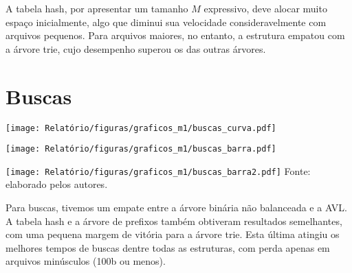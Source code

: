 A tabela hash, por apresentar um tamanho $M$ expressivo, deve alocar muito espaço inicialmente, algo que diminui sua velocidade consideravelmente com arquivos pequenos. Para arquivos maiores, no entanto, a estrutura empatou com a árvore trie, cujo desempenho superou os das outras árvores.

\section{Buscas}\label{sec-grafbuscas}

\begin{center}\label{graf_buscas_curva}
    \texttt{[image: Relatório/figuras/graficos\_m1/buscas\_curva.pdf]}
\end{center}

\begin{center}\label{graf_buscas_barra}
    \texttt{[image: Relatório/figuras/graficos\_m1/buscas\_barra.pdf]}
\end{center}

\begin{center}\label{graf_buscas_barra2}
    \texttt{[image: Relatório/figuras/graficos\_m1/buscas\_barra2.pdf]}
    \small{Fonte: elaborado pelos autores.}
\end{center}

Para buscas, tivemos um empate entre a árvore binária não balanceada e a AVL. A tabela hash e a árvore de prefixos também obtiveram resultados semelhantes, com uma pequena margem de vitória para a árvore trie. Esta última atingiu os melhores tempos de buscas dentre todas as estruturas, com perda apenas em arquivos minúsculos (100b ou menos).
